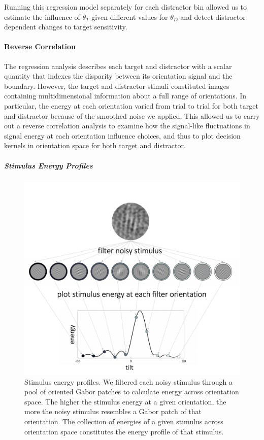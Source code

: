 \documentclass[a4paper, nobind]{templates/ociamthesis}
\begin{document}
Running this regression model separately for each distractor bin allowed us to estimate the influence of \(\theta_T\) given different values for \(\theta_D\) and detect distractor-dependent changes to target sensitivity.

\hypertarget{reverse-correlation}{%
\paragraph{Reverse Correlation}\label{reverse-correlation}}

The regression analysis describes each target and distractor with a scalar quantity that indexes the disparity between its orientation signal and the boundary. However, the target and distractor stimuli constituted images containing multidimensional information about a full range of orientations. In particular, the energy at each orientation varied from trial to trial for both target and distractor because of the smoothed noise we applied. This allowed us to carry out a reverse correlation analysis to examine how the signal-like fluctuations in signal energy at each orientation influence choices, and thus to plot decision kernels in orientation space for both target and distractor.

\hypertarget{stimulus-energy-profiles}{%
\subparagraph{Stimulus Energy Profiles}\label{stimulus-energy-profiles}}

\begin{figure}

{\centering \includegraphics[width=0.75\linewidth]{figures/distr-methods-energy} 

}

\caption[Reverse correlation analysis, Stimulus energy]{Stimulus energy profiles. We filtered each noisy stimulus through a pool of oriented Gabor patches to calculate energy across orientation space. The higher the stimulus energy at a given orientation, the more the noisy stimulus resembles a Gabor patch of that orientation. The collection of energies of a given stimulus across orientation space constitutes the energy profile of that stimulus. }\label{fig:distr-methods-energy}
\end{figure}
\end{document}
